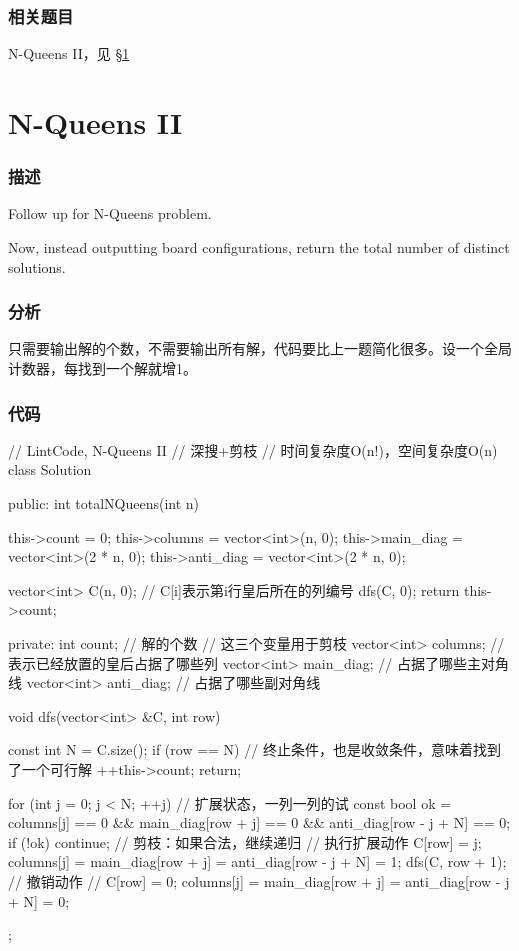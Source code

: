 \subsubsection{相关题目}
\begindot
\item N-Queens II，见 \S \ref{sec:n-queens-ii}
\myenddot


\section{N-Queens II} %
\label{sec:n-queens-ii}


\subsubsection{描述}
Follow up for N-Queens problem.

Now, instead outputting board configurations, return the total number of distinct solutions.


\subsubsection{分析}
只需要输出解的个数，不需要输出所有解，代码要比上一题简化很多。设一个全局计数器，每找到一个解就增1。


\subsubsection{代码}
\begin{Code}
// LintCode, N-Queens II
// 深搜+剪枝
// 时间复杂度O(n!)，空间复杂度O(n)
class Solution {
public:
    int totalNQueens(int n) {
        this->count = 0;
        this->columns = vector<int>(n, 0);
        this->main_diag = vector<int>(2 * n, 0);
        this->anti_diag = vector<int>(2 * n, 0);

        vector<int> C(n, 0);  // C[i]表示第i行皇后所在的列编号
        dfs(C, 0);
        return this->count;
    }
private:
    int count; // 解的个数
    // 这三个变量用于剪枝
    vector<int> columns;  // 表示已经放置的皇后占据了哪些列
    vector<int> main_diag;  // 占据了哪些主对角线
    vector<int> anti_diag;  // 占据了哪些副对角线

    void dfs(vector<int> &C, int row) {
        const int N = C.size();
        if (row == N) { // 终止条件，也是收敛条件，意味着找到了一个可行解
            ++this->count;
            return;
        }

        for (int j = 0; j < N; ++j) {  // 扩展状态，一列一列的试
            const bool ok = columns[j] == 0 &&
                    main_diag[row + j] == 0 &&
                    anti_diag[row - j + N] == 0;
            if (!ok) continue;  // 剪枝：如果合法，继续递归
            // 执行扩展动作
            C[row] = j;
            columns[j] = main_diag[row + j] =
                    anti_diag[row - j + N] = 1;
            dfs(C, row + 1);
            // 撤销动作
            // C[row] = 0;
            columns[j] = main_diag[row + j] =
                    anti_diag[row - j + N] = 0;
        }
    }
};
\end{Code}


